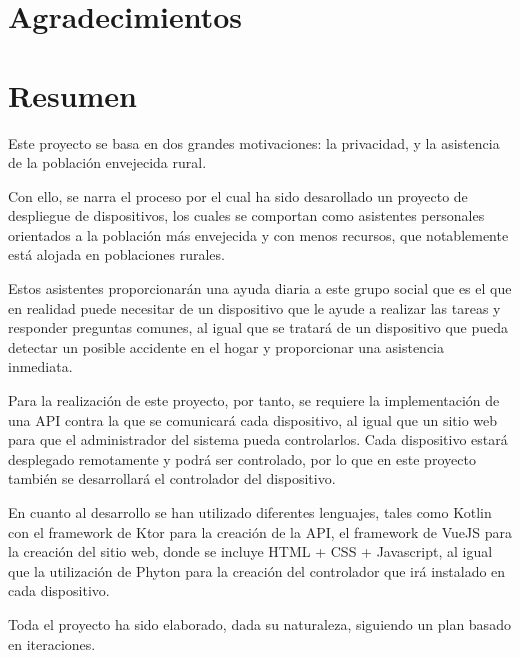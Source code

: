 \documentclass[openright,twoside,10pt]{book}
\begin{document}
\chapter*{Agradecimientos} %


\chapter*{Resumen} %
\begin{flushleft}

Este proyecto se basa en dos grandes motivaciones: la privacidad, y la asistencia de la población envejecida rural.

Con ello, se narra el proceso por el cual ha sido desarollado un proyecto de despliegue de dispositivos, los cuales se comportan como asistentes personales orientados a la población más envejecida y con menos recursos, que notablemente está alojada en poblaciones rurales.

Estos asistentes proporcionarán una ayuda diaria a este grupo social que es el que en realidad puede necesitar de un dispositivo que le ayude a realizar las tareas y responder preguntas comunes, al igual que se tratará de un dispositivo que pueda detectar un posible accidente en el hogar y proporcionar una asistencia inmediata.

Para la realización de este proyecto, por tanto, se requiere la implementación de una API contra la que se comunicará cada dispositivo, al igual que un sitio web para que el administrador del sistema pueda controlarlos. Cada dispositivo estará desplegado remotamente y podrá ser controlado, por lo que en este proyecto también se desarrollará el controlador del dispositivo.

En cuanto al desarrollo se han utilizado diferentes lenguajes, tales como Kotlin con el framework de Ktor para la creación de la API, el framework de VueJS para la creación del sitio web, donde se incluye HTML + CSS + Javascript, al igual que la utilización de Phyton para la creación del controlador que irá instalado en cada dispositivo.

Toda el proyecto ha sido elaborado, dada su naturaleza, siguiendo un plan basado en iteraciones.


\end{flushleft}
\end{document}
